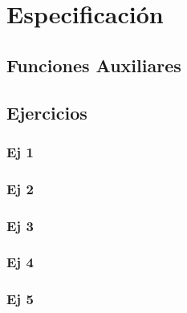 \documentclass[10pt,a4paper]{article}
\begin{document}
\maketitle

\section{Especificación}

\subsection{Funciones Auxiliares}


\subsection{Ejercicios}

\subsubsection{Ej 1}
 

\subsubsection{Ej 2}
%

\subsubsection{Ej 3}


\subsubsection{Ej 4}


\subsubsection{Ej 5}

\end{document}
